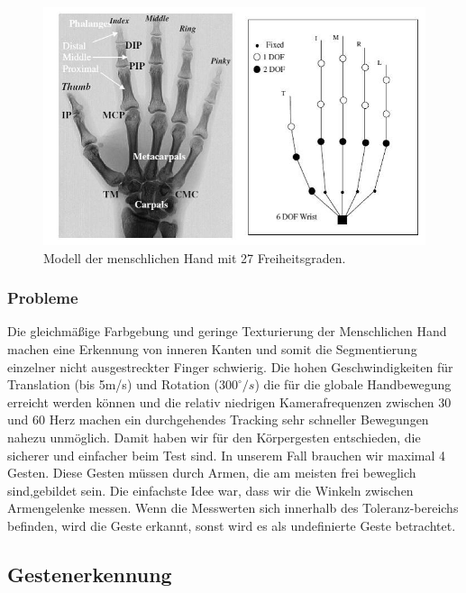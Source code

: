 \begin{figure}[h]
\label{fig:gesten_skelett}
\centering
\includegraphics[scale=0.7]{graphics/BILD-HandModell.png}
\caption{Modell der menschlichen Hand mit 27 Freiheitsgraden.}
\end{figure}

\subsubsection{Probleme}
\authorsection{\editorhamza}

Die gleichmäßige Farbgebung und geringe Texturierung der Menschlichen Hand machen eine Erkennung von inneren Kanten und somit die Segmentierung einzelner nicht ausgestreckter Finger schwierig. 
Die hohen Geschwindigkeiten für Translation (bis 5m/s) und Rotation ($300^\circ/s$) die für die globale Handbewegung erreicht werden können und die relativ niedrigen Kamerafrequenzen zwischen 30 und 60 Herz machen ein durchgehendes Tracking sehr schneller Bewegungen nahezu unmöglich.
Damit haben  wir für den  Körpergesten  entschieden, die sicherer und einfacher beim Test sind. 
In unserem Fall brauchen wir maximal 4 Gesten. Diese Gesten müssen durch Armen, die am meisten frei beweglich sind,gebildet sein.  Die einfachste Idee war, dass wir die Winkeln  zwischen Armengelenke messen. Wenn die Messwerten sich  innerhalb des Toleranz-bereichs befinden, wird die Geste erkannt, sonst  wird es als undefinierte Geste betrachtet. 

\subsection{Gestenerkennung}
\label{gestenerkennung_gestenerkennung_sec}

